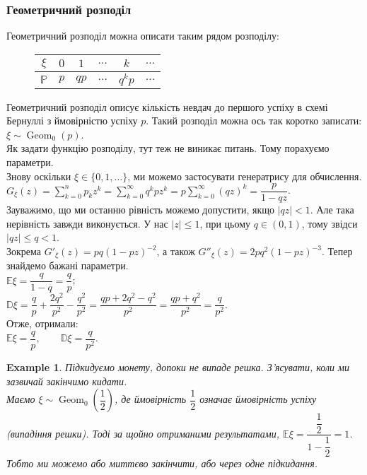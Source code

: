 \documentclass[a4paper, 10pt]{article}
\theoremstyle{theoremdd}
\newtheorem{example}[theorem]{Example}
\DeclareMathOperator{\Geom}{Geom}
\begin{document}
\subsubsection{Геометричний розподіл}
Геометричний розподіл можна описати таким рядом розподілу:
\begin{figure}[H]
\centering
\begin{tabular}{c|c|c|c|c|c}
$\xi$ & $0$ & $1$ & $\dots$ & $k$ & $\dots$ \\
\hline
$\mathbb{P}$ & $p$ & $qp$ & $\dots$ & $q^kp$ & $\dots$ \\
\end{tabular}
\end{figure}
\noindent
Геометричний розподіл описує кількість невдач до першого успіху в схемі Бернуллі з ймовірністю успіху $p$. Такий розподіл можна ось так коротко записати: $\xi \sim \Geom_0(p)$.\\
Як задати функцію розподілу, тут теж не виникає питань. Тому порахуємо параметри.\\
Знову оскільки $\xi \in \{0,1,\dots\}$, ми можемо застосувати генератрису для обчислення.\\
$G_\xi(z) = \displaystyle\sum_{k=0}^n p_k z^k = \displaystyle\sum_{k=0}^\infty q^k p z^k = p \sum_{k=0}^\infty (qz)^k = \dfrac{p}{1-qz}$.\\
Зауважимо, що ми останню рівність можемо допустити, якщо $|qz| <1$. Але така нерівність завжди виконується. У нас $|z| \leq 1$, при цьому $q \in (0,1)$, тому звідси $|qz| \leq q < 1$.\\
Зокрема $G'_\xi(z) = pq(1-pz)^{-2}$, а також $G''_\xi(z) = 2pq^2(1-pz)^{-3}$. Тепер знайдемо бажані параметри.\\
$\mathbb{E}\xi = \dfrac{q}{1-q} = \dfrac{q}{p}$;\\
$\mathbb{D}\xi = \dfrac{q}{p} + \dfrac{2q^2}{p^2} - \dfrac{q^2}{p^2} = \dfrac{qp + 2q^2 - q^2}{p^2} = \dfrac{qp+q^2}{p^2} = \dfrac{q}{p^2}$.\\
Отже, отримали:\\
$\mathbb{E}\xi = \dfrac{q}{p},\qquad \mathbb{D}\xi = \dfrac{q}{p^2}$.

\begin{example}
Підкидуємо монету, допоки не випаде решка. З'ясувати, коли ми зазвичай закінчимо кидати.\\
Маємо $\xi \sim \Geom_0\left(\dfrac{1}{2}\right)$, де ймовірність $\dfrac{1}{2}$ означає ймовірність успіху (випадіння решки). Тоді за щойно отриманими результатами, $\mathbb{E}\xi = \dfrac{\dfrac{1}{2}}{1 - \dfrac{1}{2}} = 1$. Тобто ми можемо або миттєво закінчити, або через одне підкидання.
\end{example}
\end{document}
